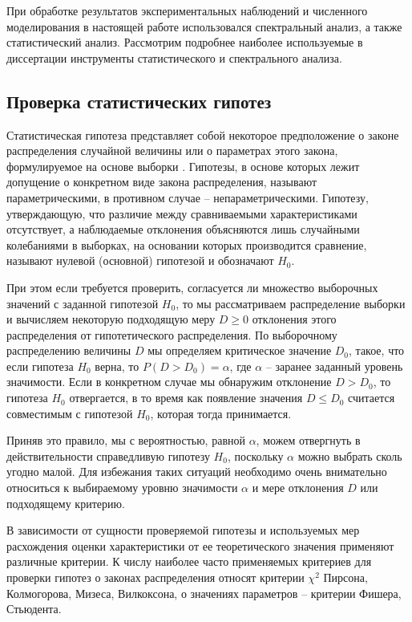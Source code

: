 При обработке результатов экспериментальных наблюдений и численного моделирования в настоящей работе использовался спектральный анализ, а также статистический анализ. Рассмотрим подробнее наиболее используемые в диссертации инструменты статистического и спектрального анализа.

\subsection{Проверка статистических гипотез}

Статистическая гипотеза представляет собой некоторое предположение о законе распределения случайной величины или о параметрах этого закона, формулируемое на основе выборки \cite{gmurman, leman, hodasev}. Гипотезы, в основе которых лежит допущение о конкретном виде закона распределения, называют параметрическими, в противном случае – непараметрическими. Гипотезу, утверждающую, что различие между сравниваемыми характеристиками отсутствует, а наблюдаемые отклонения объясняются лишь случайными колебаниями в выборках, на основании которых производится сравнение, называют нулевой (основной) гипотезой и обозначают $H_0$.

При этом если требуется проверить, согласуется ли множество выборочных значений с заданной гипотезой $H_0$, то мы рассматриваем распределение выборки и вычисляем некоторую подходящую меру $D\ge0$ отклонения этого распределения от гипотетического распределения. По выборочному распределению величины $D$ мы определяем критическое значение $D_0$, такое, что если гипотеза $H_0$  верна, то $P(D>D_0)=\alpha$, где $\alpha$ -- заранее заданный уровень значимости. Если в конкретном случае мы обнаружим отклонение $D>D_0$, то гипотеза $H_0$ отвергается, в то время как появление значения $D\le D_0$ считается совместимым с гипотезой $H_0$, которая тогда принимается.

Приняв это правило, мы с вероятностью, равной $\alpha$, можем отвергнуть в действительности справедливую гипотезу $H_0$, поскольку $\alpha$ можно выбрать сколь угодно малой. Для избежания таких ситуаций необходимо очень внимательно относиться к выбираемому уровню значимости $\alpha$ и мере отклонения $D$ или подходящему критерию.

В зависимости от сущности проверяемой гипотезы и используемых мер расхождения оценки характеристики от ее теоретического значения применяют различные критерии. К числу наиболее часто применяемых критериев для проверки гипотез о законах распределения относят критерии $\chi^2$ Пирсона, Колмогорова, Мизеса, Вилкоксона, о значениях параметров – критерии Фишера, Стьюдента.

